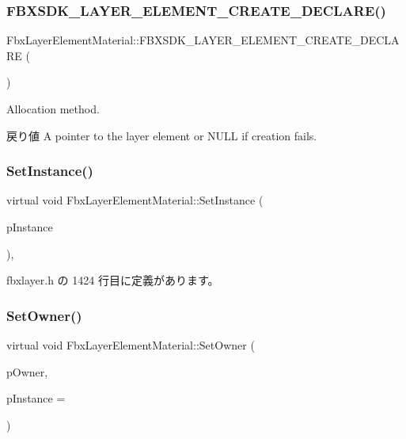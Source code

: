 \subsubsection{\texorpdfstring{F\+B\+X\+S\+D\+K\+\_\+\+L\+A\+Y\+E\+R\+\_\+\+E\+L\+E\+M\+E\+N\+T\+\_\+\+C\+R\+E\+A\+T\+E\+\_\+\+D\+E\+C\+L\+A\+R\+E()}{FBXSDK\_LAYER\_ELEMENT\_CREATE\_DECLARE()}}
{\footnotesize\ttfamily Fbx\+Layer\+Element\+Material\+::\+F\+B\+X\+S\+D\+K\+\_\+\+L\+A\+Y\+E\+R\+\_\+\+E\+L\+E\+M\+E\+N\+T\+\_\+\+C\+R\+E\+A\+T\+E\+\_\+\+D\+E\+C\+L\+A\+RE (\begin{DoxyParamCaption}\item[{Layer\+Element\+Material}]{ }\end{DoxyParamCaption})}

Allocation method. \begin{DoxyReturn}{戻り値}
A pointer to the layer element or {\ttfamily N\+U\+LL} if creation fails. 
\end{DoxyReturn}
\mbox{\label{class_fbx_layer_element_material_a45d70417f95d962c5e41bed5480888dc}} 
\subsubsection{\texorpdfstring{Set\+Instance()}{SetInstance()}}
{\footnotesize\ttfamily virtual void Fbx\+Layer\+Element\+Material\+::\+Set\+Instance (\begin{DoxyParamCaption}\item[{int}]{p\+Instance }\end{DoxyParamCaption})\hspace{0.3cm}{\ttfamily [inline]}, {\ttfamily [virtual]}}



 fbxlayer.\+h の 1424 行目に定義があります。

\mbox{\label{class_fbx_layer_element_material_afe025ea61981c53c05cb97bcd9174631}} 
\subsubsection{\texorpdfstring{Set\+Owner()}{SetOwner()}}
{\footnotesize\ttfamily virtual void Fbx\+Layer\+Element\+Material\+::\+Set\+Owner (\begin{DoxyParamCaption}\item[{\hyperlink{class_fbx_layer_container}{Fbx\+Layer\+Container} $\ast$}]{p\+Owner,  }\item[{int}]{p\+Instance = {} }\end{DoxyParamCaption})\hspace{0.3cm}{\ttfamily [virtual]}}



